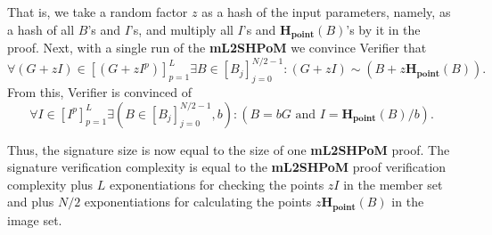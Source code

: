 \documentclass{mathcryptology} %
\newcommand{\Hpoint}{\textbf{H}_{\textbf{point}}}
\theoremstyle{title}
\theoremstyle{titleof}
\begin{document}
    That is, we take a random factor $z$ as a hash of the input parameters, namely, as a hash of all $B$'s and $I$'s, and multiply all $I$'s and $\Hpoint\left(B\right)$'s by it in the proof. Next, with a single run of the \textbf{mL2SHPoM} we convince Verifier that
    \begin{equation*}
        \forall \left(G+zI\right) \in {\left[\left(G+zI^{p}\right)\right]}_{p=1}^{L} \exists
        B\in {\left[B_{j}\right]}_{j=0}^{N/2-1}:
        \left(G+zI\right) \sim \left(B+z\Hpoint\left(B\right)\right).
    \end{equation*}
    From this, Verifier is convinced of
    \begin{equation*}
        \forall I\in {\left[I^{p}\right]}_{p=1}^{L} \exists \left(
        B\in {\left[B_{j}\right]}_{j=0}^{N/2-1},b \right):
        \left(B=bG \text{ and }
        I=\Hpoint\left(B\right)/b \right).
    \end{equation*}
    
    Thus, the signature size is now equal to the size of one \textbf{mL2SHPoM} proof. The signature verification complexity is equal to the \textbf{mL2SHPoM} proof verification complexity plus $L$ exponentiations for checking the points $zI$ in the member set and plus $N/2$ exponentiations for calculating the points $z\Hpoint\left(B\right)$ in the image set.
\end{document}
